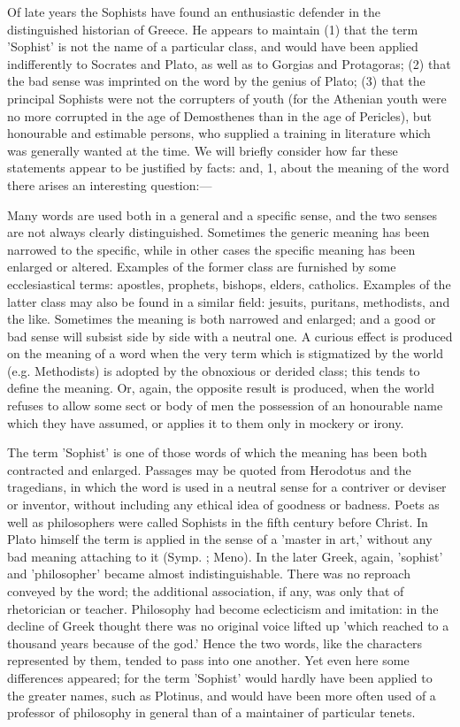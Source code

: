 \documentclass[11pt,letter]{article}
\begin{document}
\par  Of late years the Sophists have found an enthusiastic defender in the distinguished historian of Greece. He appears to maintain (1) that the term 'Sophist' is not the name of a particular class, and would have been applied indifferently to Socrates and Plato, as well as to Gorgias and Protagoras; (2) that the bad sense was imprinted on the word by the genius of Plato; (3) that the principal Sophists were not the corrupters of youth (for the Athenian youth were no more corrupted in the age of Demosthenes than in the age of Pericles), but honourable and estimable persons, who supplied a training in literature which was generally wanted at the time. We will briefly consider how far these statements appear to be justified by facts: and, 1, about the meaning of the word there arises an interesting question:—

\par  Many words are used both in a general and a specific sense, and the two senses are not always clearly distinguished. Sometimes the generic meaning has been narrowed to the specific, while in other cases the specific meaning has been enlarged or altered. Examples of the former class are furnished by some ecclesiastical terms: apostles, prophets, bishops, elders, catholics. Examples of the latter class may also be found in a similar field: jesuits, puritans, methodists, and the like. Sometimes the meaning is both narrowed and enlarged; and a good or bad sense will subsist side by side with a neutral one. A curious effect is produced on the meaning of a word when the very term which is stigmatized by the world (e.g. Methodists) is adopted by the obnoxious or derided class; this tends to define the meaning. Or, again, the opposite result is produced, when the world refuses to allow some sect or body of men the possession of an honourable name which they have assumed, or applies it to them only in mockery or irony.

\par  The term 'Sophist' is one of those words of which the meaning has been both contracted and enlarged. Passages may be quoted from Herodotus and the tragedians, in which the word is used in a neutral sense for a contriver or deviser or inventor, without including any ethical idea of goodness or badness. Poets as well as philosophers were called Sophists in the fifth century before Christ. In Plato himself the term is applied in the sense of a 'master in art,' without any bad meaning attaching to it (Symp. ; Meno). In the later Greek, again, 'sophist' and 'philosopher' became almost indistinguishable. There was no reproach conveyed by the word; the additional association, if any, was only that of rhetorician or teacher. Philosophy had become eclecticism and imitation: in the decline of Greek thought there was no original voice lifted up 'which reached to a thousand years because of the god.' Hence the two words, like the characters represented by them, tended to pass into one another. Yet even here some differences appeared; for the term 'Sophist' would hardly have been applied to the greater names, such as Plotinus, and would have been more often used of a professor of philosophy in general than of a maintainer of particular tenets.
\end{document}
